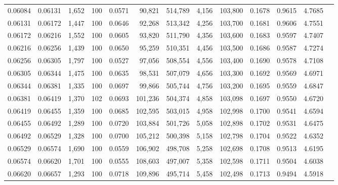 \begin{tabular}{rrrrrrrrrrrrr}
0.06084 & 0.06131 & 1,652 & 100 &                                     0.0571 &  90,821 & 514,789 &   4,156 & 103,800 & 0.1678 & 0.9615 & 4.7685 \\
0.06131 & 0.06172 & 1,447 & 100 &                                     0.0646 &  92,268 & 513,342 &   4,256 & 103,700 & 0.1681 & 0.9606 & 4.7551 \\
0.06172 & 0.06216 & 1,552 & 100 &                                     0.0605 &  93,820 & 511,790 &   4,356 & 103,600 & 0.1683 & 0.9597 & 4.7407 \\
0.06216 & 0.06256 & 1,439 & 100 &                                     0.0650 &  95,259 & 510,351 &   4,456 & 103,500 & 0.1686 & 0.9587 & 4.7274 \\
0.06256 & 0.06305 & 1,797 & 100 &                                     0.0527 &  97,056 & 508,554 &   4,556 & 103,400 & 0.1690 & 0.9578 & 4.7108 \\
0.06305 & 0.06344 & 1,475 & 100 &                                     0.0635 &  98,531 & 507,079 &   4,656 & 103,300 & 0.1692 & 0.9569 & 4.6971 \\
0.06344 & 0.06381 & 1,335 & 100 &                                     0.0697 &  99,866 & 505,744 &   4,756 & 103,200 & 0.1695 & 0.9559 & 4.6847 \\
0.06381 & 0.06419 & 1,370 & 102 &                                     0.0693 & 101,236 & 504,374 &   4,858 & 103,098 & 0.1697 & 0.9550 & 4.6720 \\
0.06419 & 0.06455 & 1,359 & 100 &                                     0.0685 & 102,595 & 503,015 &   4,958 & 102,998 & 0.1700 & 0.9541 & 4.6594 \\
0.06455 & 0.06492 & 1,289 & 100 &                                     0.0720 & 103,884 & 501,726 &   5,058 & 102,898 & 0.1702 & 0.9531 & 4.6475 \\
0.06492 & 0.06529 & 1,328 & 100 &                                     0.0700 & 105,212 & 500,398 &   5,158 & 102,798 & 0.1704 & 0.9522 & 4.6352 \\
0.06529 & 0.06574 & 1,690 & 100 &                                     0.0559 & 106,902 & 498,708 &   5,258 & 102,698 & 0.1708 & 0.9513 & 4.6195 \\
0.06574 & 0.06620 & 1,701 & 100 &                                     0.0555 & 108,603 & 497,007 &   5,358 & 102,598 & 0.1711 & 0.9504 & 4.6038 \\
0.06620 & 0.06657 & 1,293 & 100 &                                     0.0718 & 109,896 & 495,714 &   5,458 & 102,498 & 0.1713 & 0.9494 & 4.5918 \\

\end{tabular}
